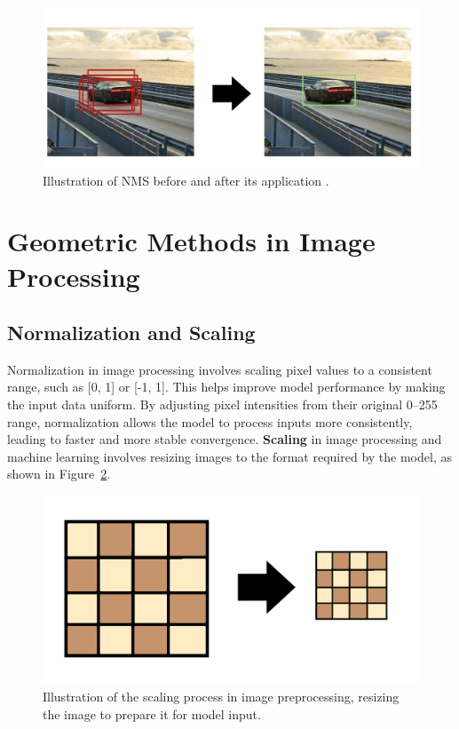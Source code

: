 \begin{figure}[h!]
    \centering
    \includegraphics[width=0.75\linewidth]{figures/theory/image-recognition/nms.png}
    \caption[NMS before and after]{Illustration of NMS before and after its application \cite{thepythoncode:nms}.}
    \label{fig:nms}
\end{figure}


\section{Geometric Methods in Image Processing}



\subsection*{Normalization and Scaling}

Normalization in image processing involves scaling pixel values to a consistent range, such as [0, 1] or [-1, 1]. This helps improve model performance by making the input data uniform. By adjusting pixel intensities from their original 0–255 range, normalization allows the model to process inputs more consistently, leading to faster and more stable convergence.
\textbf{Scaling} in image processing and machine learning involves resizing images to the format required by the model, as shown in Figure~\ref{fig:nms}. 

\begin{figure}[h!]
    \centering
    \includegraphics[width=0.75\linewidth]{figures/theory/image-recognition/scaling.png}
    \caption[Scaling in image processing]{Illustration of the scaling process in image preprocessing, resizing the image to prepare it for model input. \cite{thepythoncode:nms}}
    \label{fig:nms}
\end{figure}


